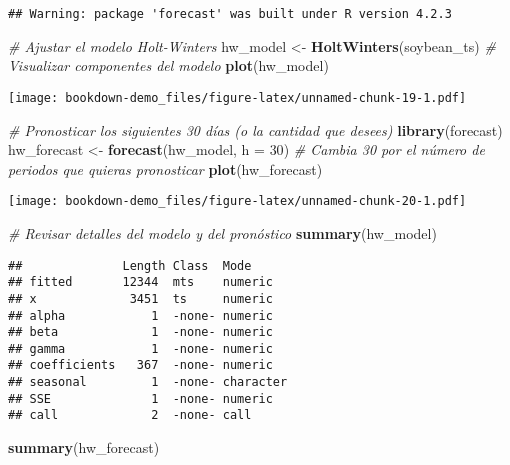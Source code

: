 \documentclass[
]{book}
\newenvironment{Shaded}{\begin{snugshade}}{\end{snugshade}}
\newcommand{\AttributeTok}[1]{\textcolor[rgb]{0.13,0.29,0.53}{#1}}
\newcommand{\CommentTok}[1]{\textcolor[rgb]{0.56,0.35,0.01}{\textit{#1}}}
\newcommand{\DecValTok}[1]{\textcolor[rgb]{0.00,0.00,0.81}{#1}}
\newcommand{\FunctionTok}[1]{\textcolor[rgb]{0.13,0.29,0.53}{\textbf{#1}}}
\newcommand{\NormalTok}[1]{#1}
\newcommand{\OtherTok}[1]{\textcolor[rgb]{0.56,0.35,0.01}{#1}}
\begin{document}
\begin{verbatim}
## Warning: package 'forecast' was built under R version 4.2.3
\end{verbatim}

\begin{Shaded}
\begin{Highlighting}[]
\CommentTok{\# Ajustar el modelo Holt{-}Winters}
\NormalTok{hw\_model }\OtherTok{\textless{}{-}} \FunctionTok{HoltWinters}\NormalTok{(soybean\_ts)}
\CommentTok{\# Visualizar componentes del modelo}
\FunctionTok{plot}\NormalTok{(hw\_model)}
\end{Highlighting}
\end{Shaded}

\texttt{[image: bookdown-demo\_files/figure-latex/unnamed-chunk-19-1.pdf]}

\begin{Shaded}
\begin{Highlighting}[]
\CommentTok{\# Pronosticar los siguientes 30 días (o la cantidad que desees)}
\FunctionTok{library}\NormalTok{(forecast)}
\NormalTok{hw\_forecast }\OtherTok{\textless{}{-}} \FunctionTok{forecast}\NormalTok{(hw\_model, }\AttributeTok{h =} \DecValTok{30}\NormalTok{)  }\CommentTok{\# Cambia 30 por el número de periodos que quieras pronosticar}
\FunctionTok{plot}\NormalTok{(hw\_forecast)}
\end{Highlighting}
\end{Shaded}

\texttt{[image: bookdown-demo\_files/figure-latex/unnamed-chunk-20-1.pdf]}

\begin{Shaded}
\begin{Highlighting}[]
\CommentTok{\# Revisar detalles del modelo y del pronóstico}
\FunctionTok{summary}\NormalTok{(hw\_model)}
\end{Highlighting}
\end{Shaded}

\begin{verbatim}
##              Length Class  Mode     
## fitted       12344  mts    numeric  
## x             3451  ts     numeric  
## alpha            1  -none- numeric  
## beta             1  -none- numeric  
## gamma            1  -none- numeric  
## coefficients   367  -none- numeric  
## seasonal         1  -none- character
## SSE              1  -none- numeric  
## call             2  -none- call
\end{verbatim}

\begin{Shaded}
\begin{Highlighting}[]
\FunctionTok{summary}\NormalTok{(hw\_forecast)}
\end{Highlighting}
\end{Shaded}
\end{document}
